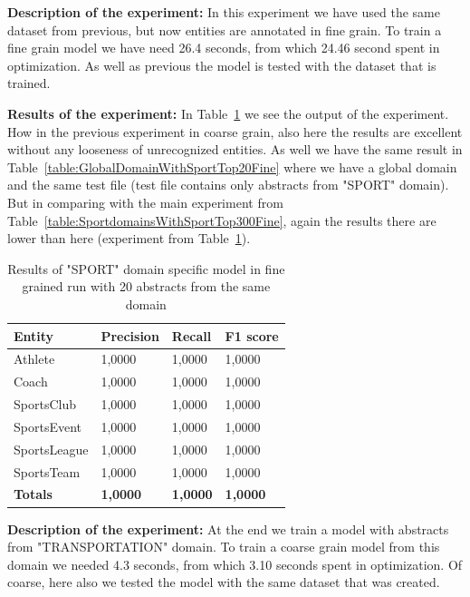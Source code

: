 \documentclass[thesis=M,english]{FITthesis}[2018/05/30]
\begin{document}
\textbf{Description of the experiment:} In this experiment we have used the same dataset from previous, but now entities are annotated in fine grain. To train a fine grain model we have need 26.4 seconds, from which 24.46 second spent in optimization. As well as previous the model is tested with the dataset that is trained.

\textbf{Results of the experiment:} In Table~\ref{table:SportDomainWithSportTop20Fine} we see the output of the experiment. How in the previous experiment in coarse grain, also here the results are excellent without any looseness of unrecognized entities. As well we have the same result in Table~\ref{table:GlobalDomainWithSportTop20Fine} where we have a global domain and the same test file (test file contains only abstracts from "SPORT" domain). But in comparing with the main experiment from Table~\ref{table:SportdomainsWithSportTop300Fine}, again the results there are lower than here (experiment from Table~\ref{table:SportDomainWithSportTop20Fine}).   

	\begin{table}[H]\centering
		\begin{tabular}{|l|l|l|l|}
			\hline {\textbf{Entity}} & {\textbf{Precision}} & {\textbf{Recall}} & {\textbf{F1 score}}\\\hline
				Athlete & 1,0000 & 1,0000 & 1,0000\\
				Coach & 1,0000 & 1,0000 & 1,0000\\
				SportsClub & 1,0000 & 1,0000 & 1,0000\\
				SportsEvent & 1,0000 & 1,0000 & 1,0000\\
				SportsLeague & 1,0000 & 1,0000 & 1,0000\\
				SportsTeam & 1,0000 & 1,0000 & 1,0000\\\hline
				\textbf{Totals} & \textbf{1,0000} & \textbf{1,0000} & \textbf{1,0000}\\\hline
		\end{tabular}
		\caption{Results of "SPORT" domain specific model in fine grained run with 20 abstracts from the same domain \label{table:SportDomainWithSportTop20Fine}}			
	\end{table}	
	
	
\textbf{Description of the experiment:} At the end we train a model with abstracts from "TRANSPORTATION" domain. To train a coarse grain model from this domain we needed 4.3 seconds, from which 3.10 seconds spent in optimization. Of coarse, here also we tested the model with the same dataset that was created. 
\end{document}
